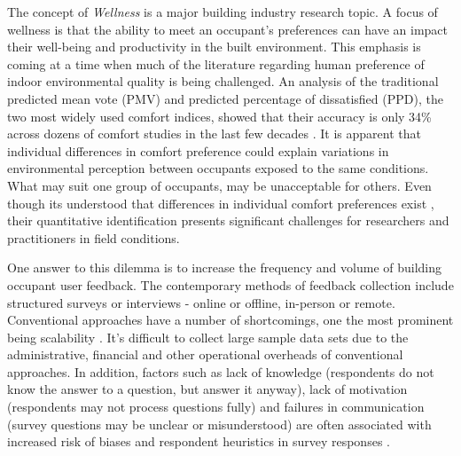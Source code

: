 

The concept of \emph{Wellness} is a major building industry research topic. A focus of wellness is that the ability to meet an occupant's preferences can have an impact their well-being and productivity in the built environment. This emphasis is coming at a time when much of the literature regarding human preference of indoor environmental quality is being challenged. An analysis of the traditional predicted mean vote (PMV) and predicted percentage of dissatisfied (PPD), the two most widely used comfort indices, showed that their accuracy is only 34\% across dozens of comfort studies in the last few decades \cite{cheung2019analysis, livcina2018development}. It is apparent that individual differences in comfort preference could explain variations in environmental perception between occupants exposed to the same conditions. What may suit one group of occupants, may be unacceptable for others. Even though its understood that differences in individual comfort preferences exist \cite{WANG2018181}, their quantitative identification presents significant challenges for researchers and practitioners in field conditions. 

One answer to this dilemma is to increase the frequency and volume of building occupant user feedback. The contemporary methods of feedback collection include structured surveys or interviews - online or offline, in-person or remote. Conventional approaches have a number of shortcomings, one the most prominent being scalability \cite{oecd}. It's difficult to collect large sample data sets due to the administrative, financial and other operational overheads of conventional approaches. In addition, factors such as lack of knowledge (respondents do not know the answer to a question, but answer it anyway), lack of motivation (respondents may not process questions fully) and failures in communication (survey questions may be unclear or misunderstood) are often associated with increased risk of biases and respondent heuristics in survey responses \cite{bradburn2004asking}. 

